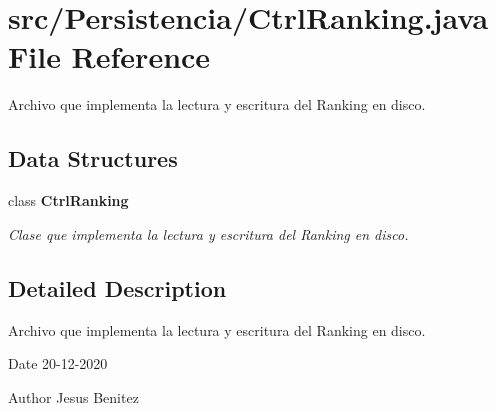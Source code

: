 \section{src/\+Persistencia/\+Ctrl\+Ranking.java File Reference}
\label{_ctrl_ranking_8java}


Archivo que implementa la lectura y escritura del Ranking en disco.  


\subsection*{Data Structures}
\begin{DoxyCompactItemize}
\item 
class \textbf{ Ctrl\+Ranking}
\begin{DoxyCompactList}\small\item\em Clase que implementa la lectura y escritura del Ranking en disco. \end{DoxyCompactList}\end{DoxyCompactItemize}


\subsection{Detailed Description}
Archivo que implementa la lectura y escritura del Ranking en disco. 

\begin{DoxyDate}{Date}
20-\/12-\/2020 
\end{DoxyDate}
\begin{DoxyAuthor}{Author}
Jesus Benitez 
\end{DoxyAuthor}
